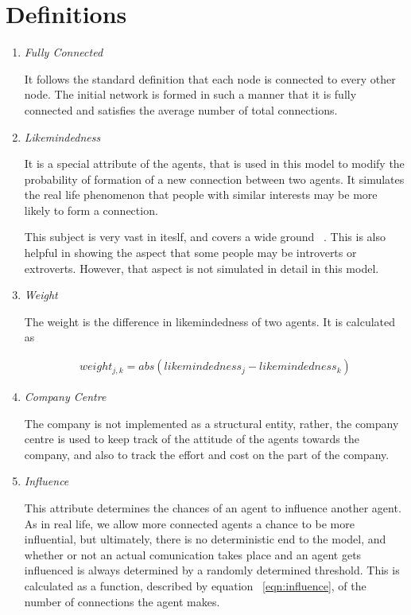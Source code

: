 \section{Definitions}
\label{sec:definitions}
\begin{enumerate}
\item \emph{Fully Connected}

It follows the standard definition that each node is connected to every other node. The initial network is formed in such a manner that it is fully connected and satisfies the average number of total connections.

\item \emph{Likemindedness}

It is a special attribute of the agents, that is used in this model to modify the probability of formation of a new connection between two agents. It simulates the real life phenomenon that people with similar interests may be more likely to form a connection. 

This subject is very vast in iteslf, and covers a wide ground ~\cite{jung1921question, Wilt08extraversion}. This is also helpful in showing the aspect that some people may be introverts or extroverts. However, that aspect is not simulated in detail in this model.

\item \emph{Weight}

The weight is the difference in likemindedness of two agents. It is calculated as 

\begin{eqnarray}
weight_{j,k} = abs( likemindedness_{j} - likemindedness_{k} )
\label{eqn:weight}
\end{eqnarray}

\item \emph{Company Centre}

The company is not implemented as a structural entity, rather, the company centre is used to keep track of the attitude of the agents towards the company, and also to track the effort and cost on the part of the company.

\item \emph{Influence}

This attribute determines the chances of an agent to influence another agent. As in real life, we allow more connected agents a chance to be more influential, but ultimately, there is no deterministic end to the model, and whether or not an actual comunication takes place and an agent gets influenced is always determined by a randomly determined threshold. 
This is calculated as a function, described by equation ~\ref{eqn:influence}, of the number of connections the agent makes.


\end{enumerate}
